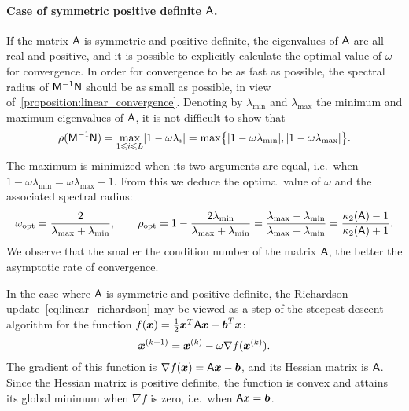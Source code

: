 \paragraph{Case of symmetric positive definite $\mathsf A$.}%
\label{par:case_of_symmetric_positive_definite_mat_a_}
If the matrix $\mathsf A$ is symmetric and positive definite,
the eigenvalues of $\mathsf A$ are all real and positive,
and it is possible to explicitly calculate the optimal value of $\omega$ for convergence.
In order for convergence to be as fast as possible,
the spectral radius of $\mathsf M^{-1} \mathsf N$ should be as small as possible,
in view of~\cref{proposition:linear_convergence}.
Denoting by $\lambda_{\min}$ and $\lambda_{\max}$ the minimum and maximum eigenvalues of $\mathsf A$,
it is not difficult to show that
\[
    \rho(\mathsf M^{-1} \mathsf N)
    = \max_{1 \leqslant i \leqslant L} \lvert1  - \omega \lambda_i\rvert
    = \max \bigl\{ \lvert1 - \omega \lambda_{\min}\rvert, \lvert1 - \omega \lambda_{\max}\rvert\bigr\}.
\]
The maximum is minimized when its two arguments are equal,
i.e.\ when $1 - \omega \lambda_{\min} = \omega \lambda_{\max} -1$.
From this we deduce the optimal value of $\omega$ and the associated spectral radius:
\[
    \omega_{\rm opt} = \frac{2}{\lambda_{\max} + \lambda_{\min}},
    \qquad
    \rho_{\rm opt}
    = 1 - \frac{2\lambda_{\min}}{\lambda_{\max} + \lambda_{\min}}
    = \frac{\lambda_{\max} - \lambda_{\min}}{\lambda_{\max} + \lambda_{\min}}
    =  \frac{\kappa_2(\mathsf A) - 1}{\kappa_2(\mathsf A) + 1}.
\]
We observe that the smaller the condition number of the matrix $\mathsf A$,
the better the asymptotic rate of convergence.

\begin{remark}
    \label{remark:linear_link_optimization}
    In the case where $\mathsf A$ is symmetric and positive definite,
    the Richardson update~\eqref{eq:linear_richardson} may be viewed as a step of the steepest descent algorithm
    for the function $f(\mathbf{\boldsymbol{x}}) = \frac{1}{2} \mathbf{\boldsymbol{x}}^T \mathsf A \mathbf{\boldsymbol{x}} - \mathbf{\boldsymbol{b}}^T \mathbf{\boldsymbol{x}}$:
    \begin{equation}
        \label{eq:linear_richardson_gradient}
        \mathbf{\boldsymbol{x}}^{(k+1)} = \mathbf{\boldsymbol{x}}^{(k)} - \omega \nabla f(\mathbf{\boldsymbol{x}}^{(k)}).
    \end{equation}
    The gradient of this function is $\nabla f(\mathbf{\boldsymbol{x}}) = \mathsf A \mathbf{\boldsymbol{x}} - \mathbf{\boldsymbol{b}}$,
    and its Hessian matrix is $\mathsf A$.
    Since the Hessian matrix is positive definite, the function is convex
    and attains its global minimum when $\nabla f$ is zero,
    i.e.\ when $\mathsf A x = \mathbf{\boldsymbol{b}}$.
\end{remark}

